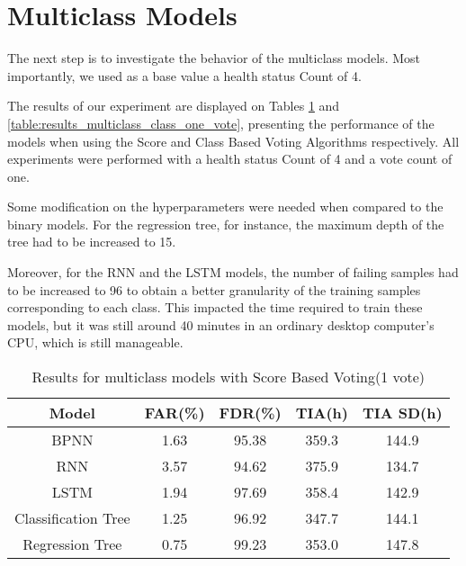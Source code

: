 \section{Multiclass Models}

The next step is to investigate the behavior of the multiclass models.
Most importantly, we used as a base value a health status Count of 4.

The results of our experiment are displayed on Tables \ref{table:results_multiclass_score_one_vote} and \ref{table:results_multiclass_class_one_vote}, presenting the performance of the models when using the Score and Class Based Voting Algorithms respectively.
All experiments were performed with a health status Count of 4 and a vote count of one.

Some modification on the hyperparameters were needed when compared to the binary models.
For the regression tree, for instance, the maximum depth of the tree had to be increased to 15.

Moreover, for the RNN and the LSTM models, the number of failing samples had to be increased to 96 to obtain a better granularity of the training samples corresponding to each class.
This impacted the time required to train these models, but it was still around 40 minutes in an ordinary desktop computer's CPU, which is still manageable.

\begin{table}
  \begin{center}
    \begin{tabular}{|c|c|c|c|c|}
      \hline
    Model & FAR(\%) & FDR(\%) & TIA(h) & TIA SD(h) \\
    \hline
    BPNN & 1.63 & 95.38 & 359.3 & 144.9 \\
    RNN & 3.57 & 94.62 & 375.9 & 134.7 \\
    LSTM & 1.94 & 97.69 & 358.4 & 142.9 \\
    Classification Tree & 1.25 & 96.92 & 347.7 & 144.1 \\
    Regression Tree & 0.75 & 99.23 & 353.0 & 147.8 \\
    \hline
    \end{tabular}
    \caption[Results Multiclass Models, Score Voting, 1 vote]{Results for multiclass models with Score Based Voting(1 vote)}
    \label{table:results_multiclass_score_one_vote}
  \end{center}
\end{table}

